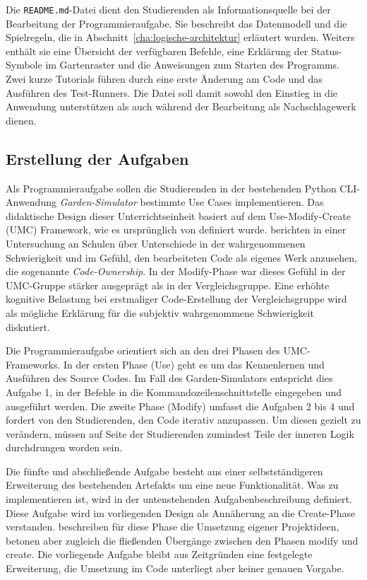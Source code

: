 Die \texttt{README.md}-Datei dient den Studierenden als Informationsquelle bei der Bearbeitung der Programmieraufgabe. Sie beschreibt das Datenmodell und die Spielregeln, die in Abschnitt~\ref{cha:logische-architektur} erläutert wurden. Weiters enthält sie eine Übersicht der verfügbaren Befehle, eine Erklärung der Status-Symbole im Gartenraster und die Anweisungen zum Starten des Programms. Zwei kurze Tutorials führen durch eine erste Änderung am Code und das Ausführen des Test-Runners. Die Datei soll damit sowohl den Einstieg in die Anwendung unterstützen als auch während der Bearbeitung als Nachschlagewerk dienen.

\subsection{Erstellung der Aufgaben}\label{cha:Aufgabenstellung}
Als Programmieraufgabe sollen die Studierenden in der bestehenden Python CLI-Anwendung \textit{Garden-Simulator} bestimmte Use Cases implementieren. Das didaktische Design dieser Unterrichtseinheit basiert auf dem Use-Modify-Create (UMC) Framework, wie es ursprünglich von \textcite{lee_umc_2011} definiert wurde. \textcite[S.~398--400]{lytle_use_2019} berichten in einer Untersuchung an Schulen über Unterschiede in der wahrgenommenen Schwierigkeit und im Gefühl, den bearbeiteten Code als eigenes Werk anzusehen, die sogenannte \textit{Code-Ownership}. In der Modify-Phase war dieses Gefühl in der UMC-Gruppe stärker ausgeprägt als in der Vergleichsgruppe. Eine erhöhte kognitive Belastung bei erstmaliger Code-Erstellung der Vergleichsgruppe wird als mögliche Erklärung für die subjektiv wahrgenommene Schwierigkeit diskutiert. 

Die Programmieraufgabe orientiert sich an den drei Phasen des UMC-Frame\-works. In der ersten Phase (Use) geht es um das Kennenlernen und Ausführen des Source Codes. Im Fall des Garden-Simulators entspricht dies Aufgabe 1, in der Befehle in die Kommandozeilenschnittstelle eingegeben und ausgeführt werden. Die zweite Phase (Modify) umfasst die Aufgaben 2 bis 4 und fordert von den Studierenden, den Code iterativ anzupassen. Um diesen gezielt zu verändern, müssen auf Seite der Studierenden zumindest Teile der inneren Logik durchdrungen worden sein.

Die fünfte und abschließende Aufgabe besteht aus einer selbstständigeren Erweiterung des bestehenden Artefakts um eine neue Funktionalität. Was zu implementieren ist, wird in der untenstehenden Aufgabenbeschreibung definiert. Diese Aufgabe wird im vorliegenden Design als Annäherung an die Create-Phase verstanden. \textcite[S.~35]{lee_umc_2011} beschreiben für diese Phase die Umsetzung eigener Projektideen, betonen aber zugleich die fließenden Übergänge zwischen den Phasen modify und create. Die vorliegende Aufgabe bleibt aus Zeitgründen eine festgelegte Erweiterung, die Umsetzung im Code unterliegt aber keiner genauen Vorgabe.

